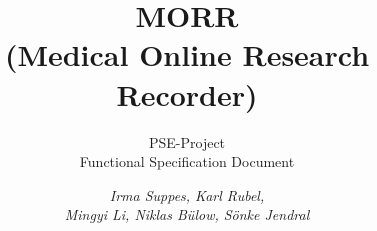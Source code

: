 \documentclass[parskip=full, 12pt, oneside]{scrbook}
\author{
	\textit{Irma Suppes, Karl Rubel, } \\ 
	\textit{Mingyi Li, Niklas Bülow, Sönke Jendral }
}
\title{MORR \\ (Medical Online Research Recorder)}
\subtitle{PSE-Project \\ Functional Specification Document}
\begin{document}
\newcommand{\requirementscope}[2]{\newcounter{counter#1}\expandafter\def\csname #2\endcsname{\addtocounter{counter#1}{10}\item[#1\arabic{counter#1}\phantomsection\label{#1\arabic{counter#1}}]}}
\newcommand{\specref}[1]{\hyperref[#1]{#1}}

\maketitle

\tableofcontents
\printnoidxglossaries
\end{document}
